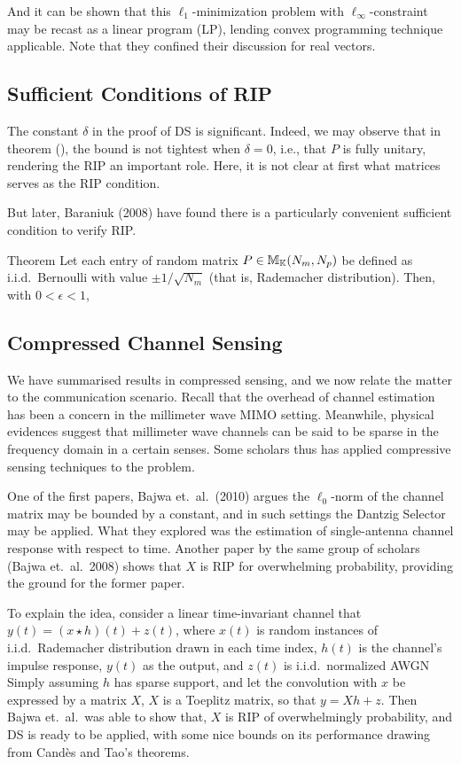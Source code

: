 And it can be shown that this \(\ell_1\)-minimization problem with \(\ell_\infty\)-constraint may be recast as a linear program (LP), lending convex programming technique applicable.
Note that they confined their discussion for real vectors.

\subsection{Sufficient Conditions of RIP}

The constant \(\delta\) in the proof of DS is significant.
Indeed, we may observe that in theorem (), the bound is not tightest when \(\delta=0\), i.e., that \(P\) is fully unitary, rendering the RIP an important role.
Here, it is not clear at first what matrices serves as the RIP condition.

But later, Baraniuk (2008) have found there is a particularly convenient sufficient condition to verify RIP.

\Result
{Theorem}
{
Let each entry of random matrix \(P \in \mathbb{M}_{\mathbb{K}} (N_m, N_p)\) be defined as i.i.d.\ Bernoulli with value \(\pm 1/\sqrt{N_m}\) (that is, Rademacher distribution).
Then, with \(0 <\epsilon <1\),
%
}

\subsection{Compressed Channel Sensing}

We have summarised results in compressed sensing, and we now relate the matter to the communication scenario.
Recall that the overhead of channel estimation has been a concern in the millimeter wave MIMO setting.
Meanwhile, physical evidences suggest that millimeter wave channels can be said to be sparse in the frequency domain in a certain senses.
Some scholars thus has applied compressive sensing techniques to the problem.

One of the first papers, Bajwa et.\ al.\ (2010) argues the \(\ell_0\)-norm of the channel matrix may be bounded by a constant, and in such settings the Dantzig Selector may be applied.
What they explored was the estimation of single-antenna channel response with respect to time.
Another paper by the same group of scholars (Bajwa et.\ al.\ 2008) shows that \(X\) is RIP for overwhelming probability, providing the ground for the former paper.

To explain the idea, consider a linear time-invariant channel that \(y(t) =(x \star h)(t) + z(t)\), where \(x(t)\) is random instances of i.i.d.\ Rademacher distribution drawn in each time index, \(h(t)\) is the channel's impulse response, \(y(t)\) as the output, and \(z(t)\) is i.i.d.\ normalized AWGN
Simply assuming \(h\) has sparse support, and let the convolution with \(x\) be expressed by a matrix \(X\), \(X\) is a Toeplitz matrix, so that \(y =X h +z\).
Then Bajwa et.\ al.\ was able to show that, \(X\) is RIP of overwhelmingly probability, and DS is ready to be applied, with some nice bounds on its performance drawing from Cand\`es and Tao's theorems.

